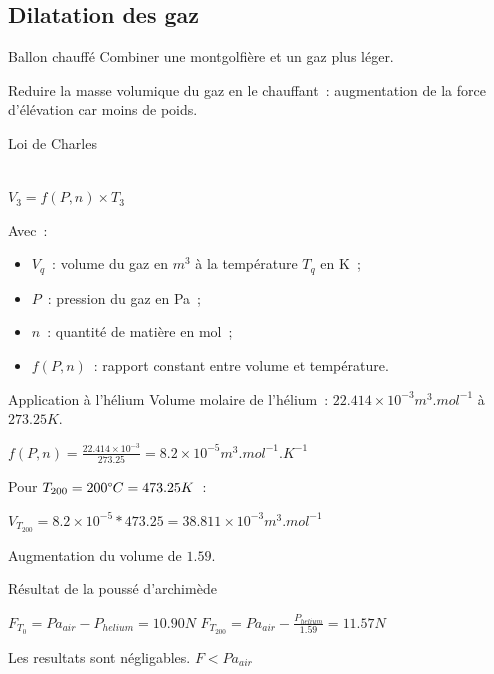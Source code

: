 \subsection{Dilatation des gaz}

\begin{frame}{Ballon chauffé}
	Combiner une montgolfière et un gaz plus léger.
	
	Reduire la masse volumique du gaz en le chauffant~: augmentation de la force d'élévation car moins de poids.
\end{frame}



\begin{frame}{Loi de Charles}
  \begin{center}
     \\
    $\displaystyle{V_3 = f(P, n) \times T_3}$
  \end{center}
  Avec~:
  \begin{itemize}
    \item $V_q$~: volume du gaz en $m^3$ à la température $T_q$ en K~;
    \item $P$~: pression du gaz en Pa~;
    \item $n$~: quantité de matière en mol~;
    \item $f(P, n)$~: rapport constant entre volume et température.
  \end{itemize}
\end{frame}

\begin{frame}{Application à l'hélium}
  Volume molaire de l'hélium~: $22.414\times 10^{-3} m^3.mol^{-1}$ à $273.25K$.
  \begin{center}
    $\displaystyle{f(P, n) = \frac{22.414\times 10^{-3}}{273.25} = 8.2\times 10^{-5} m^3.mol^{-1}.K^{-1}}$
  \end{center}
  Pour $T_{200} = 200 \degree C = 473.25 K$~:
  \begin{center}
    $\displaystyle{V_{T_{200}} = 8.2\times 10^{-5} * 473.25 = 38.811 \times 10^{-3}} m^3.mol^{-1}$
  \end{center}
  Augmentation du volume de $1.59$.
\end{frame}

\begin{frame}{Résultat de la poussé d'archimède}
  \begin{center}
    $\displaystyle{F_{T_0} = Pa_{air} - P_{helium} = 10.90 N}$
    \bigbreak
    $\displaystyle{F_{T_{200}} = Pa_{air} - \frac{P_{helium}}{1.59} = 11.57 N}$ \\
  \end{center}
  Les resultats sont négligables. $F < Pa_{air}$
\end{frame}


